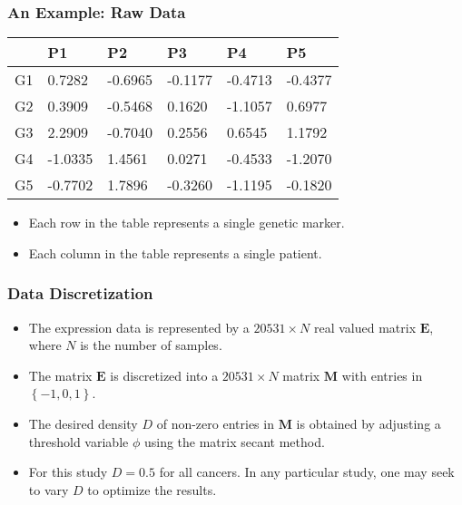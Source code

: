 \documentclass[
	11pt, %
]{beamer}
\begin{document}
\begin{frame}
	\frametitle{An Example: Raw Data}
	\begin{table}
        \begin{tabular}{|l||l|l|l|l|l|}
        \hline
         & P1 & P2 & P3 & P4 & P5 \\ \hline \hline
        G1 & 0.7282 & -0.6965 & -0.1177 & -0.4713 & -0.4377 \\ \hline
        G2 & 0.3909 & -0.5468 & 0.1620 & -1.1057 & 0.6977 \\ \hline
        G3 & 2.2909 & -0.7040 & 0.2556 & 0.6545 & 1.1792 \\ \hline
        G4 & -1.0335 & 1.4561 & 0.0271 & -0.4533 & -1.2070 \\ \hline
        G5 & -0.7702 & 1.7896 & -0.3260 & -1.1195 & -0.1820 \\ \hline
    \end{tabular}
    \end{table}

    \begin{itemize}
        \pause
        \item Each row in the table represents a single genetic marker.
        \pause
        \item Each column in the table represents a single patient.
    \end{itemize}
\end{frame}

\begin{frame}
	\frametitle{Data Discretization}
	
	\begin{itemize}
        \item The expression data is represented by a $20531 \times N$ real valued matrix $\mathbf{E}$, where $N$ is the number of samples.
        \pause
        \item The matrix $\mathbf{E}$ is discretized into a $20531 \times N$ matrix $\mathbf{M}$ with entries in $\left\{ -1, 0, 1\right\}$.
        \pause
        \item The desired density $D$ of non-zero entries in $\mathbf{M}$ is obtained by adjusting a threshold variable $\phi$ using the matrix secant method.
        \pause
        \item For this study $D = 0.5$ for all cancers. In any particular study, one may seek to vary $D$ to optimize the results.
    \end{itemize}
\end{frame}
\end{document}
